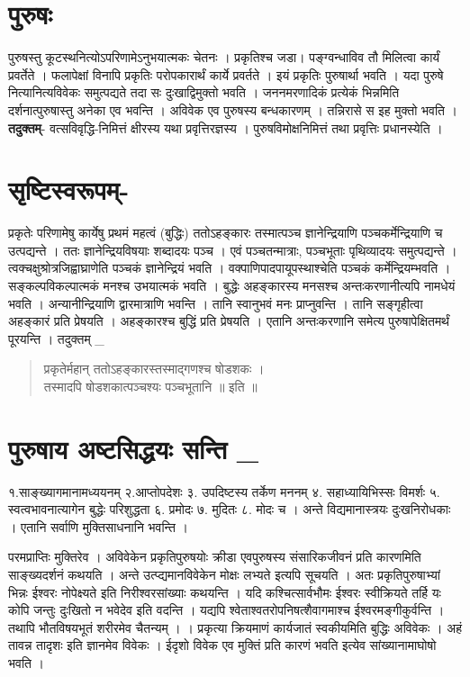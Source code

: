 \section*{पुरुषः}

पुरुषस्तु कूटस्थनित्योऽपरिणामेऽनुभयात्मकः चेतनः । प्रकृतिश्च जडा। पङ्ग्वन्धाविव तौ मिलित्वा कार्यं प्रवर्तेते । फलापेक्षां विनापि प्रकृतिः परोपकारार्थं कार्ये प्रवर्तते । इयं प्रकृतिः पुरुषार्था भवति । यदा पुरुषे नित्यानित्यविवेकः समुत्पद्यते तदा सः दुःखाद्विमुक्तो भवति । जननमरणादिकं प्रत्येकं भिन्नमिति दर्शनात्पुरुषास्तु अनेका एव भवन्ति । अविवेक एव पुरुषस्य बन्धकारणम् । तन्निरासे स इह मुक्तो भवति । \textbf{तदुक्तम्}- वत्सविवृद्धि-निमित्तं क्षीरस्य यथा प्रवृत्तिरज्ञस्य । पुरुषविमोक्षनिमित्तं तथा प्रवृत्तिः प्रधानस्येति ।

\section*{सृष्टिस्वरूपम्-} 

प्रकृतेः परिणामेषु कार्येषु प्रथमं महत्वं (बुद्धिः)  ततोऽहङ्कारः  तस्मात्पञ्च ज्ञानेन्द्रियाणि पञ्चकर्मेन्द्रियाणि च उत्पद्यन्ते । ततः ज्ञानेन्द्रियविषयाः शब्दादयः पञ्च । एवं पञ्चतन्मात्राः, पञ्चभूताः पृथिव्यादयः समुत्पद्यन्ते । त्वक्चक्षुश्रोत्रजिह्वाघ्राणेति पञ्चकं ज्ञानेन्द्रियं भवति । वक्पाणिपादपायूपस्थाश्चेति पञ्चकं कर्मेन्द्रियम्भवति । सङ्कल्पविकल्पात्मकं मनश्च उभयात्मकं भवति । बुद्धेः अहङ्कारस्य मनसश्च अन्तःकरणानीत्यपि नामधेयं भवति । अन्यानीन्द्रियाणि द्वारमात्राणि भवन्ति । तानि स्वानुभवं मनः प्राप्नुवन्ति । तानि सङ्गृहीत्वा अहङ्कारं प्रति प्रेषयति । अहङ्कारश्च बुद्धिं प्रति प्रेषयति । एतानि अन्तःकरणानि समेत्य पुरुषापेक्षितमर्थं पूरयन्ति । तदुक्तम् _
\begin{verse}
प्रकृतेर्महान् ततोऽहङ्कारस्तस्माद्गणश्च षोडशकः ।\\
तस्मादपि षोडशकात्पञ्चश्यः पञ्चभूतानि ॥ इति ॥
\end{verse}

\section*{पुरुषाय अष्टसिद्धयः सन्ति \_}

१.साङ्ख्यागमानामध्ययनम् 	२.आप्तोपदेशः ३.  उपदिष्टस्य तर्केण मननम्
४. सहाध्यायिभिस्सः विमर्शः 	५. स्वत्वभावनात्यागेन बुद्धेः परिशुद्धता	६. प्रमोदः
७. मुदितः	८. मोदः च । अन्ते विद्यमानास्त्रयः दुःखनिरोधकाः । एतानि सर्वाणि मुक्तिसाधनानि भवन्ति ।

परमप्राप्तिः मुक्तिरेव । अविवेकेन प्रकृतिपुरुषयोः क्रीडा एवपुरुषस्य संसारिकजीवनं प्रति कारणमिति साङ्ख्यदर्शनं कथयति । अन्ते उत्प्द्यमानविवेकेन मोक्षः लभ्यते इत्यपि सूचयति । अतः प्रकृतिपुरुषाभ्यां भिन्नः ईश्वरः नोपेक्ष्यते इति निरीश्वरसांख्याः कथयन्ति । यदि कश्चित्सार्वभौमः ईश्वरः स्वीक्रियते तर्हि यः कोपि जन्तुः दुःखितो न भवेदेव इति वदन्ति । यद्यपि श्वेताश्वतरोपनिषत्शैवागमाश्च ईश्वरमङ्गीकुर्वन्ति । तथापि भौतविषयभूतं शरीरमेव चैतन्यम् । । प्रकृत्या क्रियमाणं कार्यजातं स्वकीयमिति बुद्धिः अविवेकः । अहं तावन्न तादृशः इति ज्ञानमेव विवेकः । ईदृशो विवेक एव मुक्तिं प्रति कारणं भवति इत्येव सांख्यानामाघोषो भवति ।
